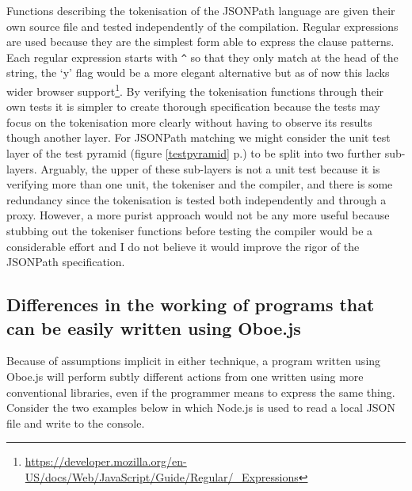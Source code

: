 \documentclass[12pt, ]{article}
\begin{document}
Functions describing the tokenisation of the JSONPath language are given
their own source file and tested independently of the compilation.
Regular expressions are used because they are the simplest form able to
express the clause patterns. Each regular expression starts with
\texttt{\^{}} so that they only match at the head of the string, the `y'
flag would be a more elegant alternative but as of now this lacks wider
browser support\footnote{\url{https://developer.mozilla.org/en-US/docs/Web/JavaScript/Guide/Regular/_Expressions}}.
By verifying the tokenisation functions through their own tests it is
simpler to create thorough specification because the tests may focus on
the tokenisation more clearly without having to observe its results
though another layer. For JSONPath matching we might consider the unit
test layer of the test pyramid (figure \ref{testpyramid}
p.\pageref{testpyramid}) to be split into two further sub-layers.
Arguably, the upper of these sub-layers is not a unit test because it is
verifying more than one unit, the tokeniser and the compiler, and there
is some redundancy since the tokenisation is tested both independently
and through a proxy. However, a more purist approach would not be any
more useful because stubbing out the tokeniser functions before testing
the compiler would be a considerable effort and I do not believe it
would improve the rigor of the JSONPath specification.

\subsection{Differences in the working of programs that can be easily
written using
Oboe.js}\label{differences-in-the-working-of-programs-that-can-be-easily-written-using-oboe.js}

Because of assumptions implicit in either technique, a program written
using Oboe.js will perform subtly different actions from one written
using more conventional libraries, even if the programmer means to
express the same thing. Consider the two examples below in which Node.js
is used to read a local JSON file and write to the console.
\end{document}
